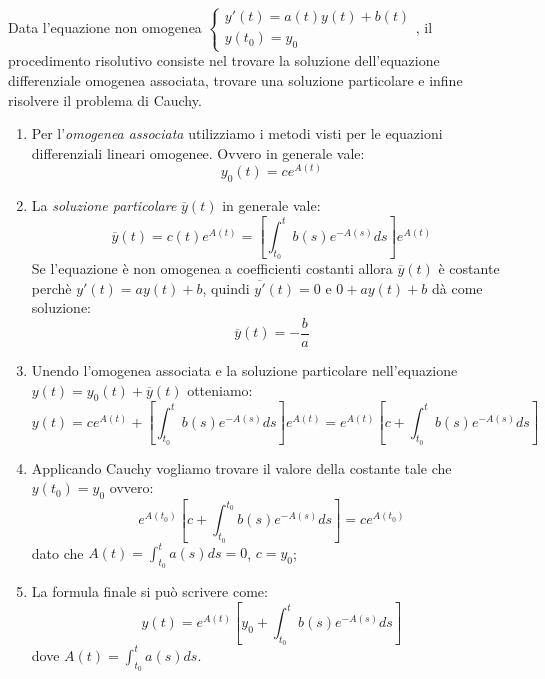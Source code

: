 Data l'equazione non omogenea $\begin{cases}y'(t)=a(t)y(t)+b(t)\\y(t_0)=y_0\end{cases}$, il procedimento risolutivo consiste nel trovare la soluzione dell'equazione differenziale omogenea associata, trovare una soluzione particolare e infine risolvere il problema di Cauchy.

\begin{enumerate}
    \item Per l'\textit{omogenea associata} utilizziamo i metodi visti per le equazioni differenziali lineari omogenee. Ovvero in generale vale:
        \begin{equation*}y_0(t)=ce^{A(t)}\end{equation*}
    
    \item La \textit{soluzione particolare} $\overline{y}(t)$ in generale vale:
        \begin{equation*}\overline{y}(t)=c(t)e^{A(t)}=\left[\int^t_{t_0}b(s)e^{-A(s)}ds\right]e^{A(t)}\end{equation*}
        Se l'equazione è non omogenea a coefficienti costanti allora $\overline{y}(t)$ è costante perchè $y'(t)=ay(t)+b$, quindi $\overline{y'}(t)=0$ e $0+ay(t)+b$ dà come soluzione:
    \begin{equation*}\overline{y}(t)=-\frac{b}{a}\end{equation*}
    
    \item Unendo l'omogenea associata e la soluzione particolare nell'equazione $y(t)=y_0(t)+\overline{y}(t)$ otteniamo:
        \begin{equation*}y(t)=ce^{A(t)}+\left[\int^t_{t_0}b(s)e^{-A(s)}ds\right]e^{A(t)}=
            e^{A(t)}\left[c+\int^t_{t_0}b(s)e^{-A(s)}ds\right]\end{equation*}
            
    \item Applicando Cauchy vogliamo trovare il valore della costante tale che $y(t_0)=y_0$ ovvero:
        \begin{equation*}e^{A(t_0)}\left[c+\int^{t_0}_{t_0}b(s)e^{-A(s)}ds\right]=ce^{A(t_0)}\end{equation*}
        dato che $A(t)=\int^t_{t_0}a(s)ds=0$, $c=y_0$;
        
    \item La formula finale si può scrivere come:
        \begin{equation*}y(t)=e^{A(t)}\left[y_0+\int^t_{t_0}b(s)e^{-A(s)}ds\right]\end{equation*}
        dove $A(t)=\int^t_{t_0}a(s)ds$.
\end{enumerate}

